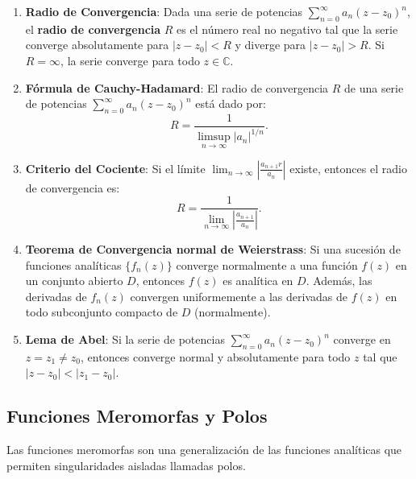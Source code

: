 \documentclass[main.tex]{subfiles}
\begin{document}
\begin{enumerate}

\item \textbf{Radio de Convergencia}:
Dada una serie de potencias \(\sum_{n=0}^\infty a_n (z - z_0)^n\), el \textbf{radio de convergencia} \(R\) es el número real no negativo tal que la serie converge absolutamente para \(|z - z_0| < R\) y diverge para \(|z - z_0| > R\). Si \(R = \infty\), la serie converge para todo \(z \in \mathbb{C}\).

\item \textbf{Fórmula de Cauchy-Hadamard}:
El radio de convergencia \(R\) de una serie de potencias \(\sum_{n=0}^\infty a_n (z - z_0)^n\) está dado por:
\[
R = \frac{1}{\limsup_{n \to \infty} |a_n|^{1/n}}.
\]

\item \textbf{Criterio del Cociente}:
Si el límite \(\lim_{n \to \infty} \left| \frac{a_{n+1}r}{a_n} \right|\) existe, entonces el radio de convergencia es:
\[
R = \frac{1}{\lim_{n \to \infty} \left| \frac{a_{n+1}}{a_n} \right|}.
\]

\item \textbf{Teorema de Convergencia normal de Weierstrass}:
Si una sucesión de funciones analíticas \(\{f_n(z)\}\) converge normalmente a una función \(f(z)\) en un conjunto abierto \(D\), entonces \(f(z)\) es analítica en \(D\). Además, las derivadas de \(f_n(z)\) convergen uniformemente a las derivadas de \(f(z)\) en todo subconjunto compacto de \(D\) (normalmente).

\item \textbf{Lema de Abel}:
Si la serie de potencias \(\sum_{n=0}^\infty a_n (z - z_0)^n\) converge en \(z = z_1 \neq z_0\), entonces converge normal y absolutamente para todo \(z\) tal que \(|z - z_0| < |z_1 - z_0|\).

\end{enumerate}
\subsection{Funciones Meromorfas y Polos}

\noindent Las funciones meromorfas son una generalización de las funciones analíticas que permiten singularidades aisladas llamadas polos.
\end{document}
